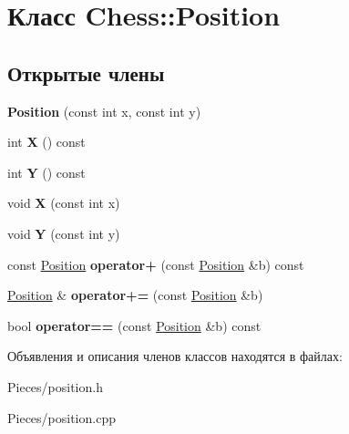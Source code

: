 \hypertarget{class_chess_1_1_position}{}\section{Класс Chess\+:\+:Position}
\label{class_chess_1_1_position}
\subsection*{Открытые члены}
\begin{DoxyCompactItemize}
\item 
\mbox{\label{class_chess_1_1_position_a8ec2fb21251eb9cd336530543ffd530f}} 
{\bfseries Position} (const int x, const int y)
\item 
\mbox{\label{class_chess_1_1_position_acf77554adfe13e96ad10a76e96d73a5d}} 
int {\bfseries X} () const
\item 
\mbox{\label{class_chess_1_1_position_a0cef56f45ccf302a87485ef3467a5e34}} 
int {\bfseries Y} () const
\item 
\mbox{\label{class_chess_1_1_position_a47e4bcc27c98e7a718ca91b6e310e339}} 
void {\bfseries X} (const int x)
\item 
\mbox{\label{class_chess_1_1_position_af0537ad95983f9423998de1239358fab}} 
void {\bfseries Y} (const int y)
\item 
\mbox{\label{class_chess_1_1_position_a660ce84d78c1694e1ba8310b694ea820}} 
const \mbox{\hyperlink{class_chess_1_1_position}{Position}} {\bfseries operator+} (const \mbox{\hyperlink{class_chess_1_1_position}{Position}} \&b) const
\item 
\mbox{\label{class_chess_1_1_position_aa67a11d7efa1a12af19b5addc1cd089e}} 
\mbox{\hyperlink{class_chess_1_1_position}{Position}} \& {\bfseries operator+=} (const \mbox{\hyperlink{class_chess_1_1_position}{Position}} \&b)
\item 
\mbox{\label{class_chess_1_1_position_a4b143d59104de22020111e8f2b9cc3a3}} 
bool {\bfseries operator==} (const \mbox{\hyperlink{class_chess_1_1_position}{Position}} \&b) const
\end{DoxyCompactItemize}


Объявления и описания членов классов находятся в файлах\+:\begin{DoxyCompactItemize}
\item 
Pieces/position.\+h\item 
Pieces/position.\+cpp\end{DoxyCompactItemize}

